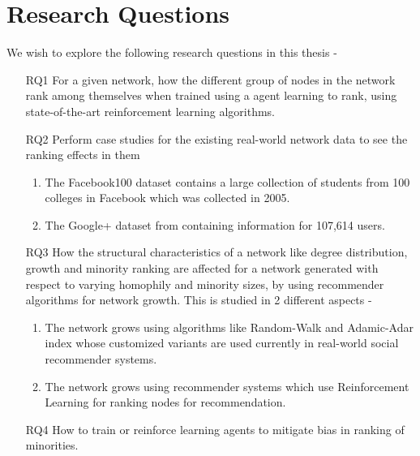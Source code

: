 \section{Research Questions}

We wish to explore the following research questions in this thesis - 

\begin{enumerate}
	
	\item[RQ1] For a given network, how the different group of nodes in the network rank among themselves when trained using a agent learning to rank, using state-of-the-art reinforcement learning algorithms. \\
	
	\item[RQ2] Perform case studies for the existing real-world network data to see the ranking effects in them
	\begin{enumerate}
		\item The Facebook100 dataset \cite{traud2012social} contains a large collection of students from 100 colleges in Facebook which was collected in 2005.
		
		\item The Google+ dataset from \cite{leskovec2012learning} containing information for 107,614 users. \\
	\end{enumerate} 

	\item[RQ3] How the structural characteristics of a network like degree distribution, growth and minority ranking are affected for a network generated with respect to varying homophily and minority sizes, by using recommender algorithms for network growth. This is studied in 2 different aspects - 
	\begin{enumerate}
		\item The network grows using algorithms like Random-Walk and Adamic-Adar index whose customized variants are used currently in real-world social recommender systems. 
		
		\item The network grows using recommender systems which use Reinforcement Learning for ranking nodes for recommendation. \\
		
	\end{enumerate} 
	
	\item[RQ4] How to train or reinforce learning agents to mitigate bias in ranking of minorities.
	
\end{enumerate}